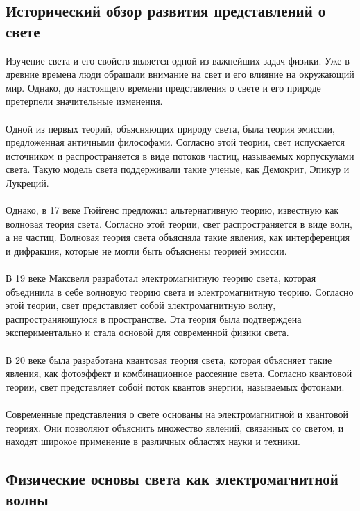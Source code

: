 \documentclass{article}
\begin{document}
\subsection{Исторический обзор развития представлений о свете}
Изучение света и его свойств является одной из важнейших задач физики. Уже в древние времена люди обращали внимание на свет и его влияние на окружающий мир. Однако, до настоящего времени представления о свете и его природе претерпели значительные изменения.\\
~\\
Одной из первых теорий, объясняющих природу света, была теория эмиссии, предложенная античными философами. Согласно этой теории, свет испускается источником и распространяется в виде потоков частиц, называемых корпускулами света. Такую модель света поддерживали такие ученые, как Демокрит, Эпикур и Лукреций.\\
~\\
Однако, в 17 веке Гюйгенс предложил альтернативную теорию, известную как волновая теория света. Согласно этой теории, свет распространяется в виде волн, а не частиц. Волновая теория света объясняла такие явления, как интерференция и дифракция, которые не могли быть объяснены теорией эмиссии.\\
~\\
В 19 веке Максвелл разработал электромагнитную теорию света, которая объединила в себе волновую теорию света и электромагнитную теорию. Согласно этой теории, свет представляет собой электромагнитную волну, распространяющуюся в пространстве. Эта теория была подтверждена экспериментально и стала основой для современной физики света.\\
~\\
В 20 веке была разработана квантовая теория света, которая объясняет такие явления, как фотоэффект и комбинационное рассеяние света. Согласно квантовой теории, свет представляет собой поток квантов энергии, называемых фотонами.\\
~\\
Современные представления о свете основаны на электромагнитной и квантовой теориях. Они позволяют объяснить множество явлений, связанных со светом, и находят широкое применение в различных областях науки и техники.
\subsection{Физические основы света как электромагнитной волны}
\end{document}
